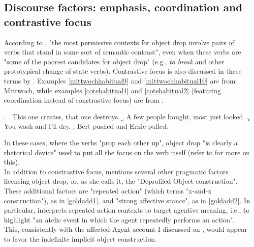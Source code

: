 \subsection{Discourse factors: emphasis, coordination and contrastive focus} 

According to \textcite[251-252]{Mittwoch2005}, "the most permissive contexts for object drop involve pairs of verbs that stand in some sort of semantic contrast", even when these verbs are "some of the poorest candidates for object drop" (e.g., \textit{to break} and other prototypical change-of-state verbs). Contrastive focus is also discussed in these terms by \textcite{Dixon1992}. Examples \ref{mittwochhabitual9} and \ref{mittwochhabitual10} are from Mittwoch, while examples \ref{cotehabitual1} and \ref{cotehabitual2} (featuring coordination instead of constrastive focus) are from \textcite[112, 143]{Cote1996}.

\ex. \label{mittwochhabitualD} \a. \label{mittwochhabitual9} This one creates, that one destroys.
\b. \label{mittwochhabitual10} A few people bought, most just looked.
\c. \label{cotehabitual1} You wash and I'll dry.
\d. \label{cotehabitual2} Bert pushed and Ernie pulled.


In these cases, where the verbs "prop each other up", object drop "is clearly a rhetorical device" used to put all the focus on the verb itself (refer to  for more on this).\\
In addition to constrastive focus, \textcite[196-197]{goldberg2006constructions} mentions several other pragmatic factors licensing object drop, or, as she calls it, the "Deprofiled Object construction". These additional factors are "repeated action" (which \textcite{Rissman2016} terms "x-and-x construction"), as in \ref{goldadd1}, and "strong affective stance", as in \ref{goldadd2}. In particular, \textcite{Rissman2016} interprets repeated-action contexts to target agentive meaning, i.e., to highlight "an atelic event in which the agent repeatedly performs an action". This, consistently with the affected-Agent account I discussed on , would appear to favor the indefinite implicit object construction.

